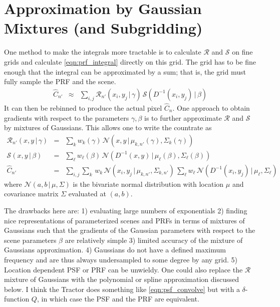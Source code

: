 \documentclass[modern]{aastex62}
\newcommand{\given}{\,|\,}
\newcommand{\countrate}{\hat{C}}
\newcommand{\prf}{\mathcal{R}}
\newcommand{\qe}{Q}
\newcommand{\scene}{\mathcal{S}}
\newcommand{\normal}{\mathcal{N}}
\begin{document}
\section{Approximation by Gaussian Mixtures (and Subgridding)}
One method to make the integrals more tractable is to calculate $\prf$ and $\scene$ on fine grids and calculate \ref{eqn:prf_integral} directly on this grid.
The grid has to be fine enough that the integral can be approximated by a sum; 
  that is, the grid must fully sample the PRF and the scene.
\begin{eqnarray}
\label{eqn:prf_grid}
\countrate_{n'} & \approx & \sum_{i,j} \prf_{n'}(x_i, y_j \given \gamma) \, \scene( D^{-1}(x_i, y_j) \given \beta) \nonumber
\end{eqnarray}
It can then be rebinned to produce the actual pixel $\countrate_n$.
One approach to obtain gradients with respect to the parameters $\gamma, \beta$ is to further approximate $\prf$ and $\scene$ by mixtures of Gaussians.
This allows one to write the countrate as 
\begin{eqnarray}
\prf_{n'}(x, y \given \gamma)  & = & \sum_k w_k(\gamma) \, \normal(x, y \given \mu_{k, n'}(\gamma), \Sigma_k(\gamma)) \\
\scene(x, y \given \beta) & = & \sum_\ell w_\ell(\beta) \, \normal(D^{-1}(x, y) \given \mu_\ell(\beta), \Sigma_\ell(\beta)) \nonumber \\
\countrate_{n'} & = & \sum_{i,j}\sum_{k} \, w_k \, \normal(x_i, y_j \given \mu_{k, n'}, \Sigma_{k, n'}) \, \sum_\ell w_\ell \, \normal(D^{-1}(x_i, y_j) \given \mu_{\ell}, \Sigma_{\ell}) \nonumber
\end{eqnarray}
where $\normal(a, b \given \mu, \Sigma)$ is the bivariate normal distribution with location $\mu$ and covariance matrix $\Sigma$ evaluated at $(a, b)$.


The drawbacks here are:
   1) evaluating large numbers of exponentials
   2) finding nice representations of parameterized scenes and PRFs in terms of mixtures of Gaussians such that the gradients of the Gaussian parameters with respect to the scene parameters $\beta$ are relatively simple
   3) limited accuracy of the mixture of Gaussians approximation.
   4) Gaussians do not have a defined maximum frequency and are thus always undersampled to some degree by any grid.
   5) Location dependent PSF or PRF can be unwieldy.
One could also replace the $\prf$ mixture of Gaussians with the polynomial or spline approximation discussed below.
I think the Tractor does something like \ref{eqn:psf_convolve} but with a $\delta$-function $\qe$, in which case the PSF and the PRF are equivalent.
\end{document}
